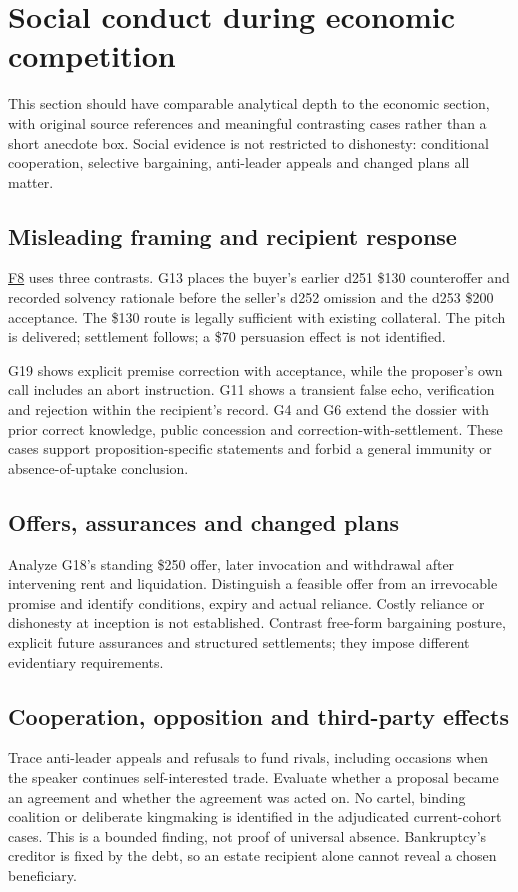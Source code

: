 \section{Social conduct during economic competition}
This section should have comparable analytical depth to the economic section, with original source references and meaningful contrasting cases rather than a short anecdote box. Social evidence is not restricted to dishonesty: conditional cooperation, selective bargaining, anti-leader appeals and changed plans all matter.

\subsection{Misleading framing and recipient response}
\href{run:../astra/exhibits/f08_social_chronology.png}{F8} uses three contrasts. G13 places the buyer's earlier d251 \$130 counteroffer and recorded solvency rationale before the seller's d252 omission and the d253 \$200 acceptance. The \$130 route is legally sufficient with existing collateral. The pitch is delivered; settlement follows; a \$70 persuasion effect is not identified.

G19 shows explicit premise correction with acceptance, while the proposer's own call includes an abort instruction. G11 shows a transient false echo, verification and rejection within the recipient's record. G4 and G6 extend the dossier with prior correct knowledge, public concession and correction-with-settlement. These cases support proposition-specific statements and forbid a general immunity or absence-of-uptake conclusion.

\subsection{Offers, assurances and changed plans}
Analyze G18's standing \$250 offer, later invocation and withdrawal after intervening rent and liquidation. Distinguish a feasible offer from an irrevocable promise and identify conditions, expiry and actual reliance. Costly reliance or dishonesty at inception is not established. Contrast free-form bargaining posture, explicit future assurances and structured settlements; they impose different evidentiary requirements.

\subsection{Cooperation, opposition and third-party effects}
Trace anti-leader appeals and refusals to fund rivals, including occasions when the speaker continues self-interested trade. Evaluate whether a proposal became an agreement and whether the agreement was acted on. No cartel, binding coalition or deliberate kingmaking is identified in the adjudicated current-cohort cases. This is a bounded finding, not proof of universal absence. Bankruptcy's creditor is fixed by the debt, so an estate recipient alone cannot reveal a chosen beneficiary.

